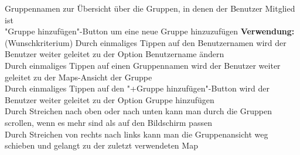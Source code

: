 Gruppennamen zur Übersicht über die Gruppen, in denen der Benutzer Mitglied ist\\
"Gruppe hinzufügen"-Button um eine neue Gruppe hinzuzufügen
\textbf{Verwendung:}\\
(Wunschkriterium) Durch einmaliges Tippen auf den Benutzernamen wird der Benutzer weiter geleitet zu der Option Benutzername ändern\\
Durch einmaliges Tippen auf einen Gruppennamen wird der Benutzer weiter geleitet zu der Maps-Ansicht der Gruppe\\
Durch einmaliges Tippen auf den "+Gruppe hinzufügen"-Button wird der Benutzer weiter geleitet zu der Option Gruppe hinzufügen\\
Durch Streichen nach oben oder nach unten kann man durch die Gruppen scrollen, wenn es mehr sind als auf den Bildschirm passen\\
Durch Streichen von rechts nach links kann man die Gruppenansicht weg schieben und gelangt zu der zuletzt verwendeten Map\\ \\

